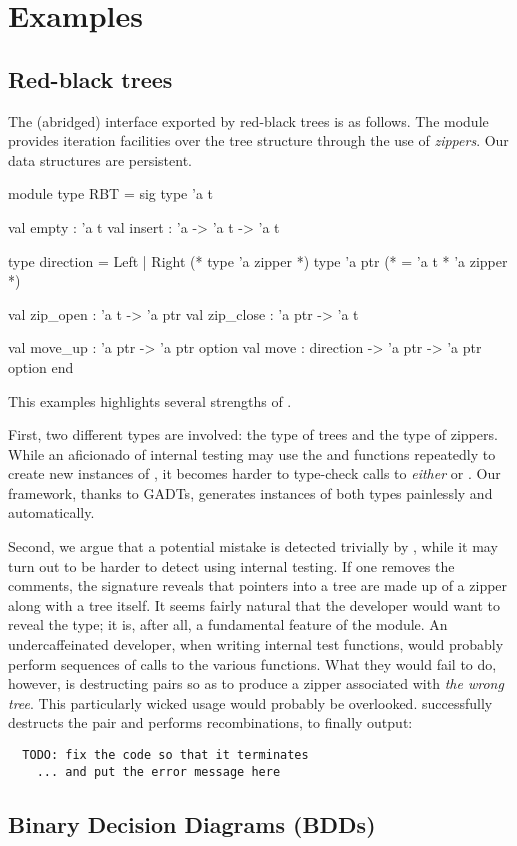 \section{Examples}

\subsection{Red-black trees}
The (abridged) interface exported by red-black trees is as follows. The module
provides iteration facilities over the tree structure through the use of
\emph{zippers}. Our data structures are persistent.
%
\begin{ocamlcode}
module type RBT = sig
  type 'a t

  val empty : 'a t
  val insert : 'a -> 'a t -> 'a t

  type direction = Left | Right
  (* type 'a zipper *)
  type 'a ptr (* = 'a t * 'a zipper *)

  val zip_open : 'a t -> 'a ptr
  val zip_close : 'a ptr -> 'a t

  val move_up : 'a ptr -> 'a ptr option
  val move : direction -> 'a ptr -> 'a ptr option
end
\end{ocamlcode}
%
This examples highlights several strengths of \arti.

First, two different types are involved: the type of trees and the type of
zippers. While an aficionado of internal testing may use the  and
 functions repeatedly to create new instances of , it
becomes harder to type-check calls to \emph{either}  or
. Our framework, thanks to GADTs, generates instances of both
types painlessly and automatically.

Second, we argue that a potential mistake is detected trivially by \arti, while
it may turn out to be harder to detect using internal testing. If one removes
the comments, the signature reveals that pointers into a tree are made up of a
zipper along with a tree itself. It seems fairly natural that the developer
would want to reveal the  type; it is, after all, a fundamental
feature of the module. An undercaffeinated developer, when writing internal test
functions, would probably perform sequences of calls to the various functions.
What they would fail to do, however, is destructing pairs so as to produce
a zipper associated with \emph{the wrong tree}. This particularly wicked usage
would probably be overlooked. \arti successfully destructs the pair and performs
recombinations, to finally output:
\begin{verbatim}
  TODO: fix the code so that it terminates
    ... and put the error message here
\end{verbatim}

\subsection{Binary Decision Diagrams (BDDs)}

